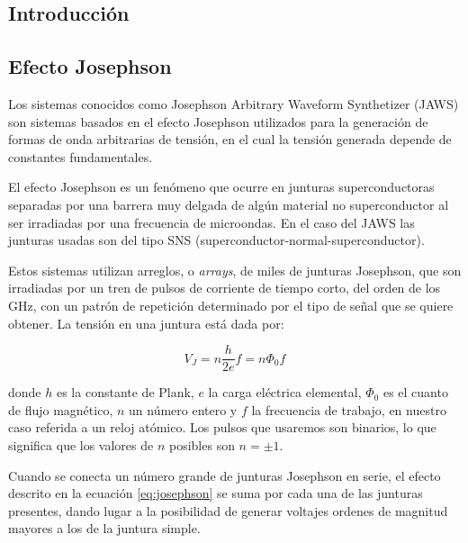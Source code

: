 \documentclass[twoside]{article}
\begin{document}
\begin{multicols}{2}


\section{Introducción}

\subsection{Efecto Josephson}

Los sistemas conocidos como Josephson Arbitrary Waveform Synthetizer (JAWS) \cite{behr2012} \cite{benz1996} \cite{benz1998} son sistemas basados en el efecto Josephson utilizados para la generación de formas de onda arbitrarias de tensión, en el cual la tensión generada depende de constantes fundamentales.

El efecto Josephson es un fenómeno que ocurre en junturas superconductoras separadas por una barrera muy delgada de algún material no superconductor al ser irradiadas por una frecuencia de microondas. En el caso del JAWS las junturas usadas son del tipo SNS (superconductor-normal-superconductor).




Estos sistemas utilizan arreglos, o {\it arrays}, de miles de junturas Josephson,  que son irradiadas por un tren de pulsos de corriente de tiempo corto, del orden de los GHz, con un patrón de repetición determinado por el tipo de señal que se quiere obtener. La tensión en una juntura está dada por:

\begin{equation}
    V_J = n \frac{h}{2e}f = n \Phi_0 f
    \label{eq:josephson}
\end{equation}

donde $h$ es la constante de Plank, $e$ la carga eléctrica elemental, $\Phi_0$ es el cuanto de flujo magnético, $n$ un número entero y $f$ la frecuencia de trabajo, en nuestro caso referida a un reloj atómico. Los pulsos que usaremos son binarios, lo que significa que los valores de $n$ posibles son $n=\pm 1$.

Cuando se conecta un número grande de junturas Josephson en serie, el efecto descrito en la ecuación \ref{eq:josephson} se suma por cada una de las junturas presentes, dando lugar a la posibilidad de generar voltajes ordenes de magnitud mayores a los de la juntura simple. 


\end{multicols}
\end{document}
